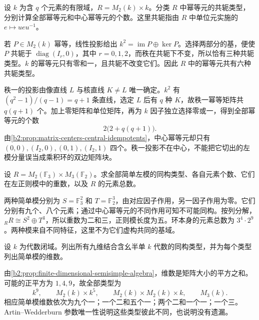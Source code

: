 \begin{exercise}\label{b2:ex:13-center-and-idempotents}
	设 \(k\) 为含 \(q\) 个元素的有限域，\(R=M_2(k)\times k\)。分类 \(R\) 中幂等元的共轭类型，分别计算全部幂等元和中心幂等元的个数。这里共轭指由 \(R\) 中单位元实施的 \(e\mapsto ueu^{-1}\)。
\end{exercise}
\begin{solution}
	若 \(P\in M_2(k)\) 幂等，线性投影给出 \(k^2=\operatorname{im}P\oplus\ker P\)。选择两部分的基，便使 \(P\) 共轭于 \(\operatorname{diag}(I_r,0)\)，其中 \(r=0,1,2\)，而秩在共轭下不变，所以恰有三种共轭类型。\(k\) 的幂等元只有零和一，且共轭不改变它们。因此 \(R\) 中的幂等元共有六种共轭类型。

	秩一的投影由像直线 \(L\) 与核直线 \(K\ne L\) 唯一确定。\(k^2\) 有 \((q^2-1)/(q-1)=q+1\) 条直线，选定 \(L\) 后有 \(q\) 种 \(K\)，故秩一幂等矩阵共 \(q(q+1)\) 个。加上零矩阵和单位矩阵，再为 \(k\) 因子独立选择零或一，得到全部幂等元的个数
	\[
		2\bigl(2+q(q+1)\bigr).
	\]
	由\cref{b2:prop:matrix-centers-central-idempotents}，中心幂等元却只有 \((0,0),(I_2,0),(0,1),(I_2,1)\) 四个。秩一投影不在中心，不能把它切出的左模分量误当成乘积环的双边矩阵块。
\end{solution}

\begin{exercise}\label{b2:ex:13-concrete-finite-product}
	设 \(R=M_2(\mathbb F_3)\times M_3(\mathbb F_2)\)。求全部简单左模的同构类型、各自元素个数、它们在左正则模中的重数，以及 \(R\) 的元素总数。
\end{exercise}
\begin{solution}
	两种简单模分别为 \(S=\mathbb F_3^2\) 和 \(T=\mathbb F_2^3\)，由对应因子作用，另一因子作用为零。它们分别有九个、八个元素；通过中心幂等元的不同作用可知不可能同构。按列分解，\({}_RR\cong S^2\oplus T^3\)，所以重数为二和三，正则模长度为五。环本身的元素总数为 \(3^4\cdot2^9\)。两种模来自不同特征，这里不为它们虚构共同的基域。
\end{solution}

\begin{exercise}\label{b2:ex:13-dimension-nine}
	设 \(k\) 为代数闭域。列出所有九维结合含幺半单 \(k\) 代数的同构类型，并为每个类型列出简单模的维数。
\end{exercise}
\begin{solution}
	由\cref{b2:prop:finite-dimensional-semisimple-algebra}，维数是矩阵大小的平方之和。可能的正平方为 \(1,4,9\)，故全部类型为
	\[
		k^9,\qquad M_2(k)\times k^5,\qquad M_2(k)\times M_2(k)\times k,\qquad M_3(k).
	\]
	相应简单模维数依次为九个一；一个二和五个一；两个二和一个一；一个三。Artin–Wedderburn 参数唯一性说明这些类型彼此不同，也说明没有遗漏。
\end{solution}

